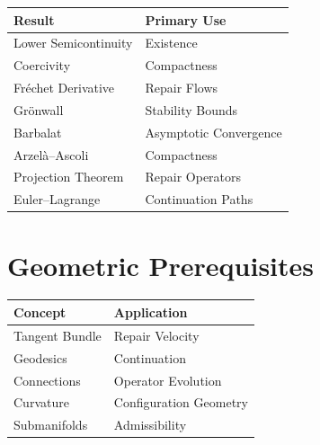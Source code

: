 \documentclass[11pt]{book}
\numberwithin{equation}{chapter}
\theoremstyle{definition}
\theoremstyle{plain}
\begin{document}
\begin{center}

\begin{tabular}{ll}

Result &
Primary Use
\\
\hline

Lower Semicontinuity &
Existence
\\

Coercivity &
Compactness
\\

Fréchet Derivative &
Repair Flows
\\

Grönwall &
Stability Bounds
\\

Barbalat &
Asymptotic Convergence
\\

Arzelà--Ascoli &
Compactness
\\

Projection Theorem &
Repair Operators
\\

Euler--Lagrange &
Continuation Paths

\end{tabular}

\end{center}


\section{Geometric Prerequisites}

\begin{center}

\begin{tabular}{ll}

Concept &
Application
\\
\hline

Tangent Bundle &
Repair Velocity
\\

Geodesics &
Continuation
\\

Connections &
Operator Evolution
\\

Curvature &
Configuration Geometry
\\

Submanifolds &
Admissibility

\end{tabular}

\end{center}
\end{document}
